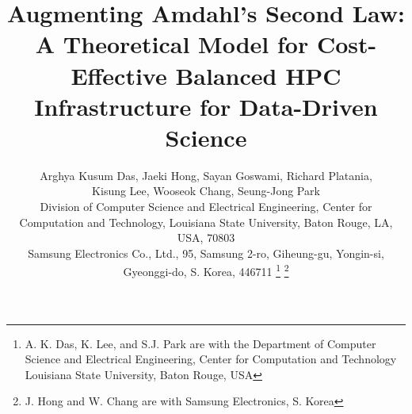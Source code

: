 \documentclass[journal]{IEEEtran}
\begin{document}
%
\title{Augmenting Amdahl's Second Law:  A Theoretical Model for Cost-Effective Balanced HPC Infrastructure for Data-Driven Science}
%
%
%

\author{
Arghya Kusum Das, %
Jaeki Hong, %
Sayan Goswami,
Richard Platania,\\
Kisung Lee, %
Wooseok Chang,
Seung-Jong Park \\
Division of Computer Science and Electrical Engineering, Center for Computation and Technology, Louisiana State University, Baton Rouge, LA, USA, 70803\\
Samsung Electronics Co., Ltd., 95, Samsung 2-ro, Giheung-gu, Yongin-si, Gyeonggi-do, S. Korea, 446711
\thanks{A. K. Das, K. Lee, and S.J. Park are with the Department
of Computer Science and Electrical Engineering, Center for Computation and Technology Louisiana State University, Baton Rouge, USA}
\thanks{J. Hong and W. Chang are with Samsung Electronics, S. Korea}
}

% 
%
\end{document}

